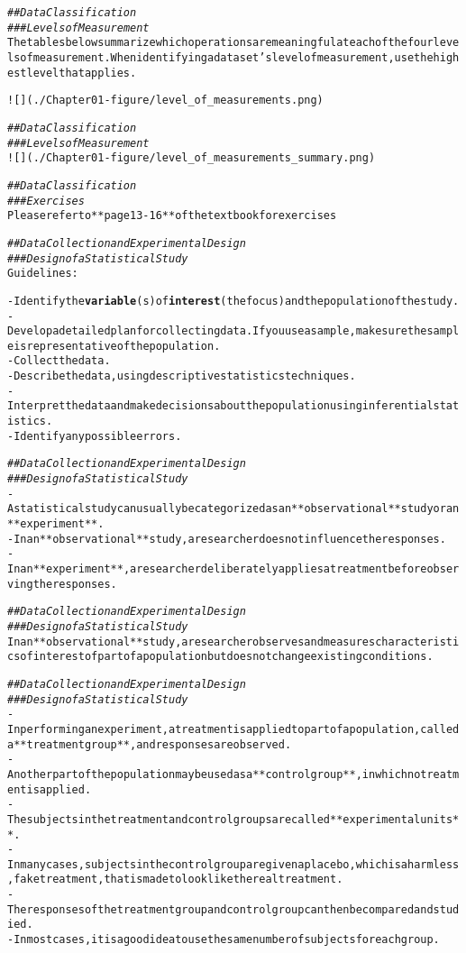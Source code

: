 \documentclass{article}\usepackage[]{graphicx}\usepackage[]{color}
\makeatletter
\newcommand{\hlcom}[1]{\textcolor[rgb]{0.678,0.584,0.686}{\textit{#1}}}%
\newcommand{\hlkwd}[1]{\textcolor[rgb]{0.737,0.353,0.396}{\textbf{#1}}}%
\newenvironment{kframe}{%
 \def\at@end@of@kframe{}%
 \ifinner\ifhmode%
  \def\at@end@of@kframe{\end{minipage}}%
  \begin{minipage}{\columnwidth}%
 \fi\fi%
 \def\FrameCommand##1{\hskip\@totalleftmargin \hskip-\fboxsep
 \colorbox{shadecolor}{##1}\hskip-\fboxsep
     \hskip-\linewidth \hskip-\@totalleftmargin \hskip\columnwidth}%
 \MakeFramed {\advance\hsize-\width
   \@totalleftmargin\z@ \linewidth\hsize
   \@setminipage}}%
 {\par\unskip\endMakeFramed%
 \at@end@of@kframe}
\newenvironment{knitrout}{}{} %
\makeatother
\begin{document}
\begin{knitrout}
\begin{kframe}
\begin{alltt}
\hlcom{## Data Classification}
\hlcom{### Levels of Measurement}
The tables below summarize which operations are meaningful at each of the four levels of measurement. When identifying a data set’s level of measurement, use the highest level that applies.

![](./Chapter01-figure/level_of_measurements.png)

\hlcom{## Data Classification}
\hlcom{### Levels of Measurement}
![](./Chapter01-figure/level_of_measurements_summary.png)

\hlcom{## Data Classification}
\hlcom{### Exercises}
Please refer to **page 13-16** of the textbook for exercises

\hlcom{## Data Collection and Experimental Design}
\hlcom{### Design of a Statistical Study}
Guidelines:

- Identify the \hlkwd{variable}(s) of \hlkwd{interest} (the focus) and the population of the study.
- Develop a detailed plan for collecting data. If you use a sample, make sure the sample is representative of the population.
- Collect the data.
- Describe the data, using descriptive statistics techniques.
- Interpret the data and make decisions about the population using inferential statistics.
- Identify any possible errors.

\hlcom{## Data Collection and Experimental Design}
\hlcom{### Design of a Statistical Study}
- A statistical study can usually be categorized as an **observational** study or an **experiment**.
- In an **observational** study, a researcher does not influence the responses. 
- In an **experiment**, a researcher deliberately applies a treatment before observing the responses.

\hlcom{## Data Collection and Experimental Design}
\hlcom{### Design of a Statistical Study}
In an **observational** study, a researcher observes and measures characteristics of interest of part of a population but does not change existing conditions. 

\hlcom{## Data Collection and Experimental Design}
\hlcom{### Design of a Statistical Study}
- In performing an experiment, a treatment is applied to part of a population, called a **treatment group**, and responses are observed. 
- Another part of the population may be used as a **control group**, in which no treatment is applied. 
- The subjects in the treatment and control groups are called **experimental units**.
- In many cases, subjects in the control group are given a placebo, which is a harmless, fake treatment, that is made to look like the real treatment. 
- The responses of the treatment group and control group can then be compared and studied. 
- In most cases, it is a good idea to use the same number of subjects for each group.


\end{alltt}
\end{kframe}
\end{knitrout}
\end{document}

